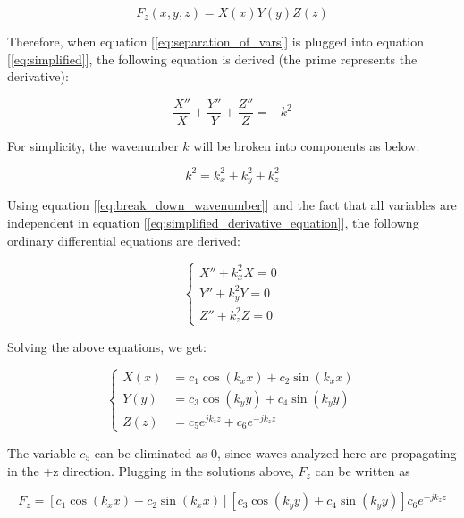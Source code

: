 \documentclass[a4paper,12pt]{report}
\begin{document}
\begin{equation} \label{eq:separation_of_vars}
  F_z(x,y,z) = X(x)Y(y)Z(z)
\end{equation}

Therefore, when equation [\ref{eq:separation_of_vars}] is plugged into equation [\ref{eq:simplified}],
the following equation is derived
(the prime represents the derivative):

\begin{equation} \label{eq:simplified_derivative_equation}
  \frac{X''}{X} + \frac{Y''}{Y} + \frac{Z''}{Z} = -k^2
\end{equation}

For simplicity, the wavenumber $k$ will be broken into components as below:

\begin{equation} \label{eq:break_down_wavenumber}
  k^2 = k_x^2 + k_y^2 + k_z^2
\end{equation}

Using equation [\ref{eq:break_down_wavenumber}] and the fact that all variables are
independent in equation [\ref{eq:simplified_derivative_equation}],
the followng ordinary differential equations are derived:

\begin{equation} \label{eq:three_ordinary}
  \left\{
  \begin{alignedat}{3}
    X'' + k_x^2 X = 0 \\
    Y'' + k_y^2 Y = 0 \\
    Z'' + k_z^2 Z = 0
  \end{alignedat}
  \right.
\end{equation}

Solving the above equations, we get:

\begin{equation} \label{eq:three_solved_ordinary}
  \left\{
  \begin{alignedat}{3}
    X(x) &= c_1 \cos (k_x x) + c_2 \sin (k_x x) \\
    Y(y) &= c_3 \cos (k_y y) + c_4 \sin (k_y y) \\
    Z(z) &= c_5 e^{j k_z z} + c_6 e^{-j k_z z}
  \end{alignedat}
  \right.
\end{equation}

The variable $c_5$ can be eliminated as $0$,
since waves analyzed here are propagating in the +z direction.
Plugging in the solutions above, $F_z$ can be written as

\begin{equation}
  F_z = [c_1 \cos (k_x x) + c_2 \sin (k_x x)][c_3 \cos (k_y y) + c_4 \sin (k_y y)]c_6 e^{-j k_z z}
\end{equation}
\end{document}
